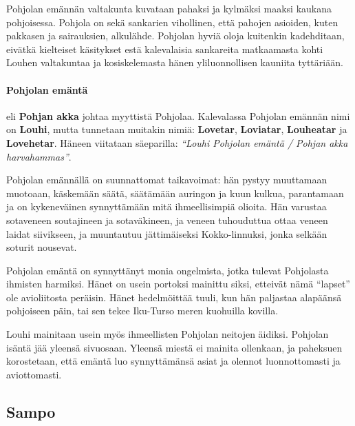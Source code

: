   Pohjolan emännän valtakunta kuvataan pahaksi ja kylmäksi maaksi kaukana pohjoisessa. Pohjola
  on sekä sankarien vihollinen, että pahojen asioiden, kuten pakkasen ja sairauksien, alkulähde.
  Pohjolan hyviä oloja kuitenkin kadehditaan, eivätkä kielteiset käsitykset estä kalevalaisia
  sankareita matkaamasta kohti Louhen valtakuntaa ja kosiskelemasta hänen yliluonnollisen kauniita
  tyttäriään.

  \paragraph{Pohjolan emäntä} eli \textbf{Pohjan akka} johtaa myyttistä Pohjolaa. Kalevalassa
  Pohjolan emännän nimi on \textbf{Louhi}, mutta tunnetaan muitakin nimiä: \textbf{Lovetar},
  \textbf{Loviatar}, \textbf{Louheatar} ja \textbf{Lovehetar}. Häneen viitataan säeparilla:
  \emph{``Louhi Pohjolan emäntä / Pohjan akka harvahammas''}.
  \par
  Pohjolan emännällä on suunnattomat taikavoimat: hän pystyy muuttamaan muotoaan, käskemään säätä,
  säätämään auringon ja kuun kulkua, parantamaan ja on kykeneväinen synnyttämään mitä
  ihmeellisimpiä olioita. Hän varustaa sotaveneen soutajineen ja sotaväkineen, ja veneen
  tuhouduttua ottaa veneen laidat siivikseen, ja muuntautuu jättimäiseksi Kokko-linnuksi, jonka
  selkään soturit nousevat.
  \par
  Pohjolan emäntä on synnyttänyt monia ongelmista, jotka tulevat Pohjolasta ihmisten harmiksi.
  Hänet on usein portoksi mainittu siksi, etteivät nämä ``lapset'' ole avioliitosta peräisin. Hänet
  hedelmöittää tuuli, kun hän paljastaa alapäänsä pohjoiseen päin, tai sen tekee Iku-Turso meren
  kuohuilla kovilla.
  \par
  Louhi mainitaan usein myös ihmeellisten Pohjolan neitojen äidiksi. Pohjolan isäntä jää yleensä
  sivuosaan. Yleensä miestä ei mainita ollenkaan, ja paheksuen korostetaan, että emäntä luo
  synnyttämänsä asiat ja olennot luonnottomasti ja aviottomasti.


\subsection{Sampo}


